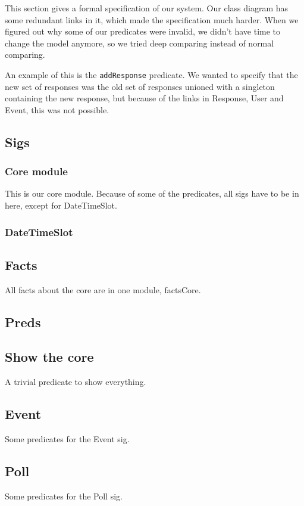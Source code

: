 This section gives a formal specification of our system. Our class diagram has some redundant links in it, which made the specification much harder. When we figured out why some of our predicates were invalid, we didn't have time to change the model anymore, so we tried deep comparing instead of normal comparing.

An example of this is the \texttt{addResponse} predicate. We wanted to specify that the new set of responses was the old set of responses unioned with a singleton containing the new response, but because of the links in Response, User and Event, this was not possible.

\subsection{Sigs}
	\subsubsection{Core module}
		This is our core module. Because of some of the predicates, all sigs have to be in here, except for DateTimeSlot.
	
		
	
	\subsubsection{DateTimeSlot}
	
		
	
\subsection{Facts}
	All facts about the core are in one module, factsCore.
	
	
	
\subsection{Preds}
	\subsection{Show the core}
		A trivial predicate to show everything.
		
		
		
	\subsection{Event}
		Some predicates for the Event sig.
		
		
		
	\subsection{Poll}
		Some predicates for the Poll sig.
		
		